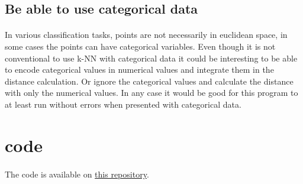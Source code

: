 \documentclass[11 pt]{article}
\begin{document}
\subsection{Be able to use categorical data}
\paragraph{}In various classification tasks, points are not necessarily in euclidean space, in some cases the points can have categorical variables. Even though it is not conventional to use k-NN with categorical data it could be interesting to be able to encode categorical values in numerical values and integrate them in the distance calculation. Or ignore the categorical values and calculate the distance with only the numerical values. In any case it would be good for this program to at least run without errors when presented with categorical data.
\pagebreak
\appendix
\section{code}
\paragraph{}The code is available on \href{https://gitlab.com/zlanderous/complexite_projet}{this repository}.
\end{document}
